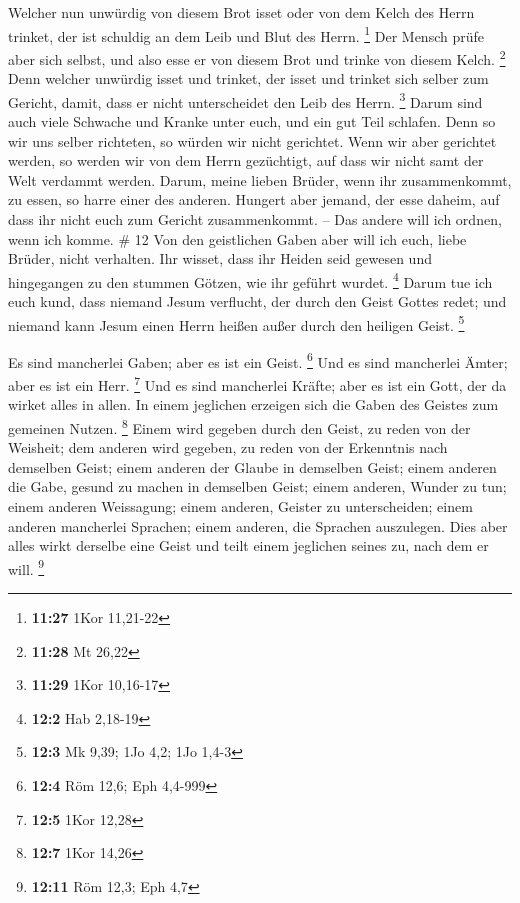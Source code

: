  Welcher nun unwürdig von diesem Brot isset oder von dem
Kelch des Herrn trinket, der ist schuldig an dem Leib und Blut des
Herrn. \footnote{\textbf{11:27} 1Kor 11,21-22}  Der Mensch
prüfe aber sich selbst, und also esse er von diesem Brot und trinke von
diesem Kelch. \footnote{\textbf{11:28} Mt 26,22}  Denn
welcher unwürdig isset und trinket, der isset und trinket sich selber
zum Gericht, damit, dass er nicht unterscheidet den Leib des Herrn.
\footnote{\textbf{11:29} 1Kor 10,16-17}  Darum sind auch
viele Schwache und Kranke unter euch, und ein gut Teil schlafen.
 Denn so wir uns selber richteten, so würden wir nicht
gerichtet.  Wenn wir aber gerichtet werden, so werden wir
von dem Herrn gezüchtigt, auf dass wir nicht samt der Welt verdammt
werden.  Darum, meine lieben Brüder, wenn ihr
zusammenkommt, zu essen, so harre einer des anderen. 
Hungert aber jemand, der esse daheim, auf dass ihr nicht euch zum
Gericht zusammenkommt. -- Das andere will ich ordnen, wenn ich komme. \#
12  Von den geistlichen Gaben aber will ich euch, liebe
Brüder, nicht verhalten.  Ihr wisset, dass ihr Heiden seid
gewesen und hingegangen zu den stummen Götzen, wie ihr geführt wurdet.
\footnote{\textbf{12:2} Hab 2,18-19}  Darum tue ich euch
kund, dass niemand Jesum verflucht, der durch den Geist Gottes redet;
und niemand kann Jesum einen Herrn heißen außer durch den heiligen
Geist. \footnote{\textbf{12:3} Mk 9,39; 1Jo 4,2; 1Jo 1,4-3}

 Es sind mancherlei Gaben; aber es ist ein Geist.
\footnote{\textbf{12:4} Röm 12,6; Eph 4,4-999}  Und es sind
mancherlei Ämter; aber es ist ein Herr. \footnote{\textbf{12:5} 1Kor
  12,28}  Und es sind mancherlei Kräfte; aber es ist ein
Gott, der da wirket alles in allen.  In einem jeglichen
erzeigen sich die Gaben des Geistes zum gemeinen Nutzen. \footnote{\textbf{12:7}
  1Kor 14,26}  Einem wird gegeben durch den Geist, zu reden
von der Weisheit; dem anderen wird gegeben, zu reden von der Erkenntnis
nach demselben Geist;  einem anderen der Glaube in demselben
Geist; einem anderen die Gabe, gesund zu machen in demselben Geist;
 einem anderen, Wunder zu tun; einem anderen Weissagung;
einem anderen, Geister zu unterscheiden; einem anderen mancherlei
Sprachen; einem anderen, die Sprachen auszulegen.  Dies
aber alles wirkt derselbe eine Geist und teilt einem jeglichen seines
zu, nach dem er will. \footnote{\textbf{12:11} Röm 12,3; Eph 4,7}

